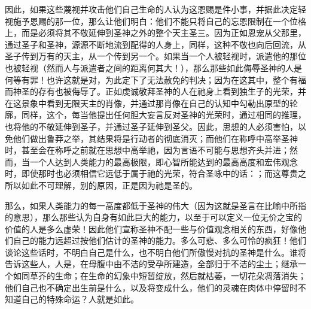因此，如果这些蔑视并攻击他们自己生命的人认为这恩赐是件小事，并据此决定轻视施予恩赐的那一位，那么让他们明白：他们不能只将自己的忘恩限制在一个位格上，而是必须将其不敬延伸到圣神之外的整个天主圣三。因为正如恩宠从父那里，通过圣子和圣神，源源不断地流到配得的人身上，同样，这种不敬也向后回流，从圣子传到万有的天主，从一个传到另一个。如果当一个人被轻视时，派遣他的那位也被轻视（然而人与派遣者之间的距离何其大！），那么那些如此侮辱圣神的人是何等有罪！也许这就是对，为此定下了无法赦免的判决；因为在这其中，整个有福而神圣的存有也被侮辱了。正如虔诚敬拜圣神的人在祂身上看到独生子的光荣，并在这景象中看到无限天主的肖像，并通过那肖像在自己的认知中勾勒出原型的轮廓，同样，这个，每当他提出任何胆大妄言反对圣神的光荣时，通过相同的推理，也将他的不敬延伸到圣子，并通过圣子延伸到圣父。因此，思想的人必须害怕，以免他们做出鲁莽之举，其结果将是行动者的彻底消灭；而他们在称呼中高举圣神时，甚至会在称呼之前就在思想中高举祂，因为言语不可能与思想齐头并进；然而，当一个人达到人类能力的最高极限，即心智所能达到的最高高度和宏伟观念时，即使那时也必须相信它远低于属于祂的光荣，符合圣咏中的话：；而这尊贵之所以如此不可理解，别的原因，正是因为祂是圣的。\par

那么，如果人类能力的每一高度都低于圣神的伟大（因为这就是圣言在比喻中所指的意思），那么那些认为自身有如此巨大的能力，以至于可以定义一位无价之宝的价值的人是多么虚荣！因此他们宣称圣神不配一些与价值观念相关的东西，好像他们自己的能力远超过按他们估计的圣神的能力。多么可悲、多么可怜的疯狂！他们谈论这些话时，不明白自己是什么，也不明白他们所傲慢对抗的圣神是什么。谁将告诉这些人，人是，在母腹中由不洁的受孕所建造，全部归于不洁的尘土；继承一个如同草芥的生命；在生命的幻象中短暂绽放，然后就枯萎，一切花朵凋落消失；他们自己也不确定出生前是什么，以及将变成什么，他们的灵魂在肉体中停留时不知道自己的特殊命运？人就是如此。\par

